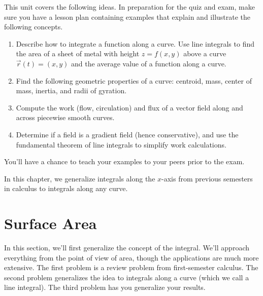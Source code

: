 
\noindent 
This unit covers the following ideas. In preparation for the quiz and exam, make sure you have a lesson plan containing examples that explain and illustrate the following concepts.  
\begin{enumerate}
\item Describe how to integrate a function along a curve. Use line integrals to find the area of a sheet of metal with height $z=f(x,y)$ above a curve $\vec r(t)=\left(x,y\right)$ and the average value of a function along a curve.
\item Find the following geometric properties of a curve: centroid, mass, center of mass, inertia, and radii of gyration.
\item Compute the work (flow, circulation) and flux of a vector field along and across piecewise smooth curves.
\item Determine if a field is a gradient field (hence conservative), and use the fundamental theorem of line integrals to simplify work calculations.
\end{enumerate}
You'll have a chance to teach your examples to your peers prior to the exam.

In this chapter, we generalize integrals along the $x$-axis from previous semesters in calculus to integrals along any curve.

\section{Surface Area}

In this section, we'll first generalize the concept of the integral.  We'll approach everything from the point of view of area, though the applications are much more extensive. The first problem is a review problem from first-semester calculus.  The second problem generalizes the idea to integrals along a curve (which we call a line integral). The third problem has you generalize your results.

